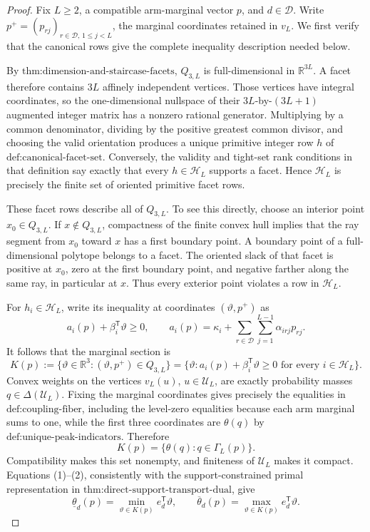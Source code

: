\documentclass{article}
\begin{document}
\begin{proof}
Fix \(L\geq 2\), a compatible arm-marginal vector \(p\), and \(d\in\mathcal D\).  Write \(p^+=(p_{rj})_{r\in\mathcal D,\,1\leq j<L}\), the marginal coordinates retained in \(v_L\).  We first verify that the canonical rows give the complete inequality description needed below.

By \(\text{thm:dimension-and-staircase-facets}\), \(Q_{3,L}\) is full-dimensional in \(\mathbb R^{3L}\).  A facet therefore contains \(3L\) affinely independent vertices.  Those vertices have integral coordinates, so the one-dimensional nullspace of their \(3L\)-by-\((3L+1)\) augmented integer matrix has a nonzero rational generator.  Multiplying by a common denominator, dividing by the positive greatest common divisor, and choosing the valid orientation produces a unique primitive integer row \(h\) of \(\text{def:canonical-facet-set}\).  Conversely, the validity and tight-set rank conditions in that definition say exactly that every \(h\in\mathcal H_L\) supports a facet.  Hence \(\mathcal H_L\) is precisely the finite set of oriented primitive facet rows.

These facet rows describe all of \(Q_{3,L}\).  To see this directly, choose an interior point \(x_0\in Q_{3,L}\).  If \(x\notin Q_{3,L}\), compactness of the finite convex hull implies that the ray segment from \(x_0\) toward \(x\) has a first boundary point.  A boundary point of a full-dimensional polytope belongs to a facet.  The oriented slack of that facet is positive at \(x_0\), zero at the first boundary point, and negative farther along the same ray, in particular at \(x\).  Thus every exterior point violates a row in \(\mathcal H_L\).

For \(h_i\in\mathcal H_L\), write its inequality at coordinates \((\vartheta,p^+)\) as
\[
 a_i(p)+\beta_i^{\mathsf T}\vartheta\geq0,
 \qquad
 a_i(p)=\kappa_i+\sum_{r\in\mathcal D}\sum_{j=1}^{L-1}\alpha_{irj}p_{rj}.
\]
It follows that the marginal section is
\[
 K(p):=\{\vartheta\in\mathbb R^3:(\vartheta,p^+)\in Q_{3,L}\}
 =\{\vartheta:a_i(p)+\beta_i^{\mathsf T}\vartheta\geq0
       \text{ for every }i\in\mathcal H_L\}.
 \tag{1}
\]
Convex weights on the vertices \(v_L(u)\), \(u\in\mathcal U_L\), are exactly probability masses \(q\in\Delta(\mathcal U_L)\).  Fixing the marginal coordinates gives precisely the equalities in \(\text{def:coupling-fiber}\), including the level-zero equalities because each arm marginal sums to one, while the first three coordinates are \(\theta(q)\) by \(\text{def:unique-peak-indicators}\).  Therefore
\[
 K(p)=\{\theta(q):q\in\Gamma_L(p)\}.                 \tag{2}
\]
Compatibility makes this set nonempty, and finiteness of \(\mathcal U_L\) makes it compact.  Equations (1)--(2), consistently with the support-constrained primal representation in \(\text{thm:direct-support-transport-dual}\), give
\[
 \underline\theta_d(p)=\min_{\vartheta\in K(p)}e_d^{\mathsf T}\vartheta,
 \qquad
 \overline\theta_d(p)=\max_{\vartheta\in K(p)}e_d^{\mathsf T}\vartheta.       \tag{3}
\]


\end{proof}
\end{document}
